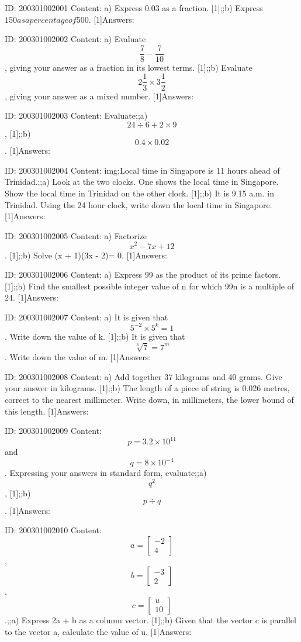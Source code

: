 \documentclass{article}
\begin{document}
ID: 200301002001
Content:
a) Express 0.03 as a fraction. [1];;b) Express $150 as a percentage of $500. [1]Answers:

ID: 200301002002
Content:
a) Evaluate $$\frac{7}{8}-\frac{7}{10}$$, giving your answer as a fraction in its lowest terms. [1];;b) Evaluate $$2\frac{1}{3} \times 3\frac{1}{2}$$, giving your answer as a mixed number. [1]Answers:

ID: 200301002003
Content:
Evaluate;;a) $$24\div 6+2 \times 9$$, [1];;b) $$0.4 \times 0.02$$. [1]Answers:

ID: 200301002004
Content:
img;Local time in Singapore is 11 hours ahead of Trinidad.;;a) Look at the two clocks. One shows the local time in Singapore. Show the local time in Trinidad on the other clock. [1];;b) It is 9.15 a.m. in Trinidad. Using the 24 hour clock, write down the local time in Singapore. [1]Answers:

ID: 200301002005
Content:
a) Factorize $$x^{2} -7x+12$$. [1];;b) Solve (x + 1)(3x - 2)= 0. [1]Answers:

ID: 200301002006
Content:
a) Express 99 as the product of its prime factors. [1];;b) Find the smallest possible integer value of n for which 99n is a multiple of 24. [1]Answers:

ID: 200301002007
Content:
a) It is given that $$5^{-2} \times 5^{k}=1$$. Write down the value of k. [1];;b) It is given that $$\sqrt[3]{7} = 7^{m}$$. Write down the value of m. [1]Answers:

ID: 200301002008
Content:
a) Add together 37 kilograms and 40 grams. Give your answer in kilograms. [1];;b) The length of a piece of string is 0.026 metres, correct to the nearest millimeter. Write down, in millimeters, the lower bound of this length. [1]Answers:

ID: 200301002009
Content:
$$p=3.2 \times 10^{11}$$ and $$q=8 \times 10^{-4}$$. Expressing your answers in standard form, evaluate;;a) $$q^{2} $$, [1];;b) $$p\div q$$. [1]Answers:

ID: 200301002010
Content:
$$a=\begin{bmatrix}-2\\4\end{bmatrix}$$, $$b=\begin{bmatrix}-3\\2\end{bmatrix}$$, $$c=\begin{bmatrix}u\\10\end{bmatrix}$$.;;a) Express 2a + b as a column vector. [1];;b) Given that the vector c is parallel to the vector a, calculate the value of u. [1]Answers:
\end{document}
